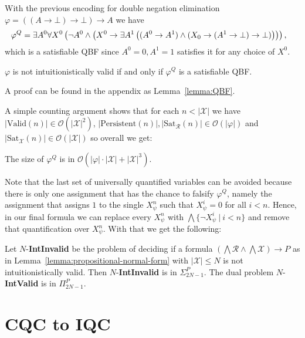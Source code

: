 \documentclass[runningheads]{llncs}
\begin{document}
\begin{example}
	With the previous encoding for double negation elimination $\varphi = ((A\to \bot)\to \bot)\to A$ we have
	$$\hspace*{-.3cm}
	\varphi^Q = \exists A^0\forall X^0\left(\neg A^0\wedge\left(X^0\to \exists A^1\left((A^0\to A^1)\wedge(X_0\to (A^1\to \bot)\to \bot)\right)\right)\right),
	$$
	which is a satisfiable QBF since $A^0 = 0, A^1 = 1$ satisfies it for any choice of $X^0$.
\end{example}


\begin{lemma}
	$\varphi$ is not intuitionistically valid if and only if $\varphi^Q$ is a satisfiable QBF.
\end{lemma}
A proof can be found in the appendix as Lemma~\ref{lemma:QBF}.

A simple counting argument shows that for each $n < |\mathcal X|$ we have $|\text{Valid}(n)|\in \mathcal O(|\mathcal X|^2)$, $|\text{Persistent}(n)|, |\text{Sat}_{\mathcal R}(n)|\in \mathcal O(|\varphi|)$ and $|\text{Sat}_{\mathcal X}(n)|\in \mathcal O(|\mathcal X|)$ so overall we get:
\begin{lemma}
	The size of $\varphi^Q$ is in $\mathcal O(|\varphi|\cdot|\mathcal X| + |\mathcal X|^3)$.
\end{lemma}

Note that the last set of universally quantified variables can be avoided because there is only one assignment that has the chance to falsify $\varphi^Q$, namely the assignment that assigns $1$ to the single $X_\psi^n$ such that $X_\psi^i = 0$ for all $i < n$. Hence, in our final formula we can replace every $X_\psi^n$ with $\bigwedge\{\neg X_\psi^i\:|\:i < n\}$ and remove that quantification over $X_\psi^n$. With that we get the following:

\begin{corollary}
	Let $N$-\textbf{IntInvalid} be the problem of deciding if a formula $(\bigwedge \mathcal R\wedge\bigwedge\mathcal X)\to P$ as in Lemma~\ref{lemma:propositional-normal-form} with $|\mathcal X|\leq N$ is not intuitionistically valid. Then $N$-\textbf{IntInvalid} is in $\Sigma_{2N-1}^P$. The dual problem $N$-\textbf{IntValid} is in $\Pi_{2N-1}^P$.
\end{corollary}


\section{CQC to IQC}
\end{document}
